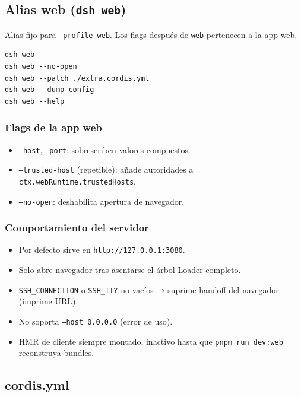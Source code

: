 \documentclass[11pt,a4paper]{article}
\begin{document}
\subsection*{Alias web (\texttt{dsh web})}


Alias fijo para \texttt{--profile web}. Los flags después de \texttt{web} pertenecen a la app web.


\begin{lstlisting}
dsh web
dsh web --no-open
dsh web --patch ./extra.cordis.yml
dsh web --dump-config
dsh web --help
\end{lstlisting}


\subsubsection*{Flags de la app web}


\begin{itemize}[leftmargin=*,topsep=2pt,itemsep=1pt]
  \item \texttt{--host}, \texttt{--port}: sobrescriben valores compuestos.
  \item \texttt{--trusted-host} (repetible): añade autoridades a \texttt{ctx.webRuntime.trustedHosts}.
  \item \texttt{--no-open}: deshabilita apertura de navegador.
\end{itemize}


\subsubsection*{Comportamiento del servidor}


\begin{itemize}[leftmargin=*,topsep=2pt,itemsep=1pt]
  \item Por defecto sirve en \texttt{http://127.0.0.1:3080}.
  \item Solo abre navegador tras asentarse el árbol Loader completo.
  \item \texttt{SSH\_CONNECTION} o \texttt{SSH\_TTY} no vacíos → suprime handoff del navegador (imprime URL).
  \item No soporta \texttt{--host 0.0.0.0} (error de uso).
  \item HMR de cliente siempre montado, inactivo hasta que \texttt{pnpm run dev:web} reconstruya bundles.
\end{itemize}


\subsection*{cordis.yml}
\end{document}
